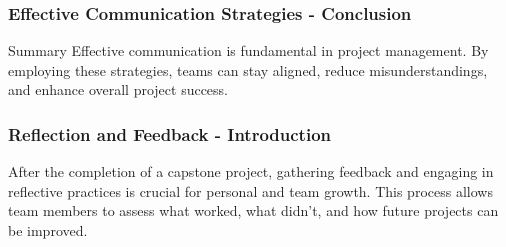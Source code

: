 \documentclass{beamer}
\begin{document}
\begin{frame}[fragile]
    \frametitle{Effective Communication Strategies - Conclusion}
    \begin{block}{Summary}
        Effective communication is fundamental in project management. By employing these strategies, teams can stay aligned, reduce misunderstandings, and enhance overall project success. 
    \end{block}
\end{frame}

\begin{frame}[fragile]
    \frametitle{Reflection and Feedback - Introduction}
    After the completion of a capstone project, 
    gathering feedback and engaging in reflective practices is crucial for personal and team growth. 
    This process allows team members to assess what worked, what didn’t, and how future projects can be improved.
\end{frame}
\end{document}

